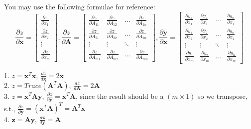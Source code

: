 \documentclass[answers]{exam}
\begin{document}
You may use the following formulae for reference:
\begin{equation*}
    \frac{\partial z}{\partial \mathbf{x}}
    =
    \begin{bmatrix}
        \frac{\partial z}{\partial x_{1}}\\
        \frac{\partial z}{\partial x_{2}}\\
        \vdots\\
        \frac{\partial z}{\partial x_{m}}
    \end{bmatrix}
    ,
    \frac{\partial z}{\partial \mathbf{A}}
    =
    \begin{bmatrix}
        \frac{\partial z}{\partial A_{11}} & \frac{\partial z}{\partial A_{12}} & \dots  & \frac{\partial z}{\partial A_{1n}} \\
        \frac{\partial z}{\partial A_{21}} & \frac{\partial z}{\partial A_{22}} & \dots  & \frac{\partial z}{\partial A_{2n}} \\
        \vdots & \vdots & \ddots & \vdots \\
        \frac{\partial z}{\partial A_{m1}} & \frac{\partial z}{\partial A_{m2}} & \dots  & \frac{\partial z}{\partial A_{mn}}
    \end{bmatrix}
    ,
    \frac{\partial \mathbf{y}}{\partial \mathbf{x}}
    =
    \begin{bmatrix}
        \frac{\partial y_{1}}{\partial x_{1}} & \frac{\partial y_{2}}{\partial x_{1}} & \dots  & \frac{\partial y_{n}}{\partial x_{1}} \\
        \frac{\partial y_{1}}{\partial x_{2}} & \frac{\partial y_{2}}{\partial x_{2}} & \dots  & \frac{\partial y_{n}}{\partial x_{2}} \\
        \vdots & \vdots & \ddots & \vdots \\
        \frac{\partial y_{1}}{\partial x_{m}} & \frac{\partial y_{2}}{\partial x_{m}} & \dots  & \frac{\partial y_{n}}{\partial x_{m}}
    \end{bmatrix}
\end{equation*}
\begin{solution}
1. $z=\mathbf{x}^{T}\mathbf{x}$, $\frac{dz}{d\mathbf{x}} = 2\mathbf{x}$\\
2. $z=Trace(\mathbf{A}^{T}\mathbf{A})$, $\frac{dz}{d\mathbf{A}} = 2\mathbf{A} $\\
3. $z=\mathbf{x}^{T}\mathbf{A}\mathbf{y}$, $\frac{\partial z}{\partial\mathbf{y}} = \mathbf{x}^{T}\mathbf{A}$, since the result should be a $(m \times 1)$ so we transpose, s.t., $\frac{\partial z}{\partial\mathbf{y}} = (\mathbf{x}^{T}\mathbf{A})^{T} = \mathbf{A}^{T}\mathbf{x}$\\
4. $\mathbf{z}=\mathbf{A}\mathbf{y}$, $\frac{d\mathbf{z}}{d\mathbf{y}} = \mathbf{A}$
\end{solution}
\end{document}
